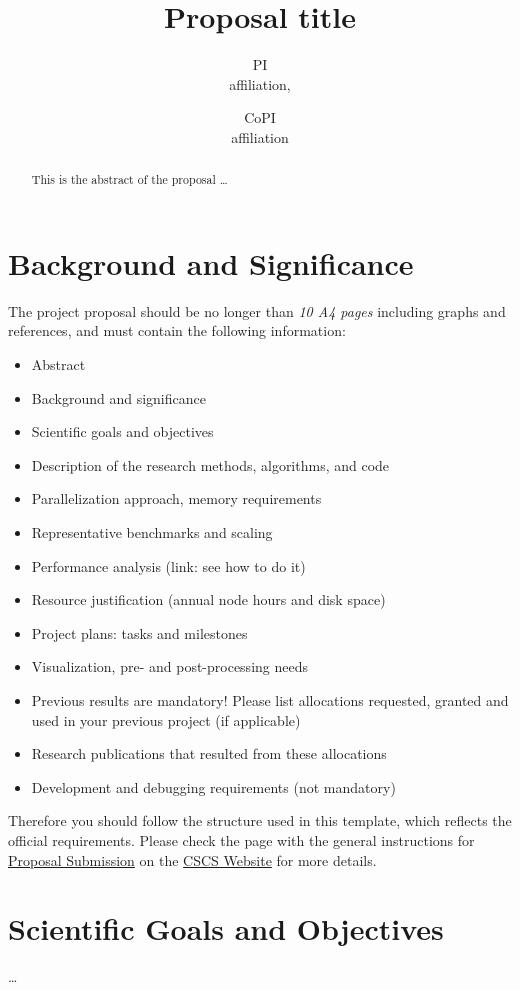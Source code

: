 \documentclass[11pt]{article}
\title{Proposal title}
\author{
        PI \\
        affiliation,
            \and
        CoPI\\
        affiliation
}
\date{}
\begin{document}
\maketitle

\begin{abstract}
 This is the abstract of the proposal \ldots
\end{abstract}

\section{Background and Significance}
The project proposal should be no longer than \emph{10 A4 pages} including graphs and references, and must contain the following information:
\begin{itemize}
 \item Abstract
 \item Background and significance
 \item Scientific goals and objectives
 \item Description of the research methods, algorithms, and code
 \item Parallelization approach, memory requirements
 \item Representative benchmarks and scaling
 \item Performance analysis (link: see how to do it)
 \item Resource justification (annual node hours and disk space)
 \item Project plans: tasks and milestones
 \item Visualization, pre- and post-processing needs
 \item Previous results are mandatory! Please list allocations requested, granted and used in your previous project (if applicable)
 \item Research publications that resulted from these allocations
 \item Development and debugging requirements (not mandatory)
\end{itemize}
Therefore you should follow the structure used in this template, which reflects the official requirements. 
Please check the page with the general instructions for \href{http://www.cscs.ch/user_lab/allocation_schemes/submission100/index.html}{Proposal Submission} on the \href{www.cscs.ch}{CSCS Website} for more details. 

\section{Scientific Goals and Objectives}
\ldots 
\end{document}
